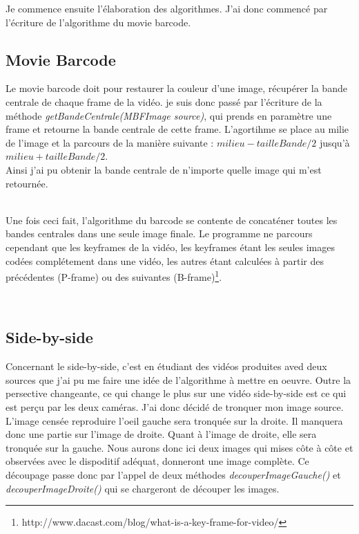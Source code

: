 \documentclass[10pt,a4paper]{article}
\begin{document}
Je commence ensuite l'élaboration des algorithmes. J'ai donc commencé par l'écriture de l'algorithme du movie barcode.
\subsection{Movie Barcode}

Le movie barcode doit pour restaurer la couleur d'une image, récupérer la bande centrale de chaque frame de la vidéo. je suis donc passé par l'écriture de la méthode \textit{getBandeCentrale(MBFImage source)},
qui prends en paramètre une frame et retourne la bande centrale de cette frame. L'agortihme se place au milie de l'image et la parcours de la manière suivante : $milieu - tailleBande /2$ jusqu'à
$milieu + tailleBande /2$.\\
Ainsi j'ai pu obtenir la bande centrale de n'importe quelle image qui m'est retournée.

~~\\

Une fois ceci fait, l'algorithme du barcode se contente de concaténer toutes les bandes centrales dans une seule image finale. Le programme ne parcours cependant que les keyframes de la vidéo,
les keyframes étant les seules images codées complétement dans une vidéo, les autres étant calculées à partir des précédentes
(P-frame) ou des suivantes (B-frame)\footnote{http://www.dacast.com/blog/what-is-a-key-frame-for-video/}.


~~\\




\subsection{Side-by-side}

Concernant le side-by-side, c'est en étudiant des vidéos produites aved deux sources que j'ai pu me faire une idée de l'algorithme à mettre en oeuvre. Outre la persective changeante,
ce qui change le plus sur une vidéo side-by-side est ce qui est perçu par les deux caméras. J'ai donc décidé de tronquer mon image source. L'image censée reproduire l'oeil gauche sera tronquée sur la droite.
Il manquera donc une partie sur l'image de droite. Quant à l'image de droite, elle sera tronquée sur la gauche.  Nous aurons donc ici deux images qui mises côte à côte et observées avec le dispoditif adéquat,
donneront une image complète.
Ce découpage passe donc par l'appel de deux méthodes \textit{decouperImageGauche()} et \textit{decouperImageDroite()} qui se chargeront de découper les images.
\end{document}
